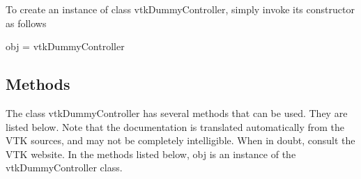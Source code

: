 To create an instance of class vtk\-Dummy\-Controller, simply invoke its constructor as follows \begin{DoxyVerb}  obj = vtkDummyController
\end{DoxyVerb}
 \hypertarget{vtkwidgets_vtkxyplotwidget_Methods}{}\subsection{Methods}\label{vtkwidgets_vtkxyplotwidget_Methods}
The class vtk\-Dummy\-Controller has several methods that can be used. They are listed below. Note that the documentation is translated automatically from the V\-T\-K sources, and may not be completely intelligible. When in doubt, consult the V\-T\-K website. In the methods listed below, {\ttfamily obj} is an instance of the vtk\-Dummy\-Controller class. 
